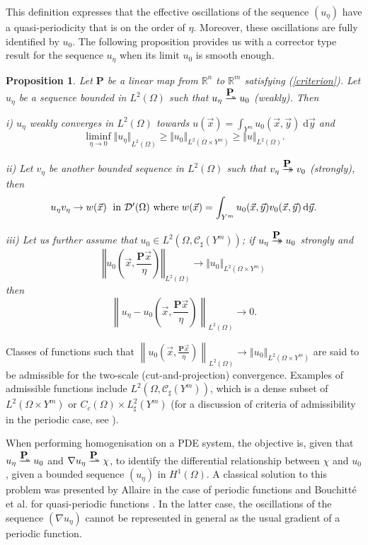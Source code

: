 \documentclass[a4paper,reqno]{amsart}
\numberwithin{equation}{section}
\numberwithin{equation}{section}		%
\numberwithin{figure}{section}			%
\numberwithin{table}{section}				%
\newcommand{\R}{\mathbb{R}}
\newtheorem{proposition}[theorem]{Proposition}
\theoremstyle{definition}
\newcommand{\<}{\ensuremath \leq}
\renewcommand{\>}{\ensuremath \geq}
\def\e{\eta}
\def\ue{u_\e}
\def\limf{\displaystyle{\liminf_{\eta\to 0}}}
\def\xxe{\left(\vec{x},\frac{\textbf{P}\vec{x}}{\e}\right)}
\def\wdto{\buildrel\hbox{$\textbf{P}$}\over
\rightharpoonup \!\!\!\!\! \rightharpoonup}
\def\dto{\buildrel\hbox{$\textbf{P}$}\over
\to \!\!\!\!\! \to}
\def\uo{u_0(\vec{x},\vec{y})}
\def\ve{v_\e}
\def\O{\Omega}
\begin{document}
This definition expresses that the effective oscillations of the
sequence $(u_\e)$ have a quasi-periodicity that is on the order of $\e$. Moreover,
these oscillations are fully identified by $u_0$.
The following proposition \cite[Proposition~2.10]{Bouchitte+etal2010} provides us with
a corrector type result for the sequence
$u_\e$ when its limit $u_0$ is smooth enough.
\begin{proposition}
Let $\textbf{P}$ be a linear map from $\R^n$ to ${\R^m}$ satisfying
(\ref{criterion}). Let $\ue$ be a sequence bounded in $L^2(\O)$ such
that $\ue\wdto u_0$ (weakly).   Then

i) $\ue$ weakly converges in $L^2(\O)$ towards $\displaystyle{u(\vec{x}) = \int_{Y^m} u_0(\vec{x},\vec{y}) \; \mathrm{d}\vec{y}}$ and
\begin{equation}
\limf {\Vert\ue\Vert}_{L^2(\O)}\geq {\Vert u_0 \Vert}_{L^2(\O \times
Y^m)} \geq {\Vert u\Vert}_{L^2(\O)}.
\end{equation}

ii) Let $\ve$ be another bounded sequence in $L^2(\O)$ such that
$v_\e\dto v_0$ (strongly), then
\begin{equation}
\ue\ve\to  w(\vec{x}) \; \hbox{ in ${\mathcal D}'(\O)$ where
$\displaystyle{w(\vec{x}) = \int_{Y^m}\uo v_0(\vec{x},\vec{y})
\,\mathrm{d}\vec{y}}$}.
\end{equation}

iii) Let us further assume that $u_0\in L^2 (\O, \mathcal{C}_\sharp (Y^m))$; if ${\displaystyle\ue\dto  u_0}$ strongly and
$$\displaystyle {{\left\Vert u_0\xxe \right\Vert}_{L^2(\O)} \to{\Vert
u_0\Vert}_{L^2(\O\times Y^m)}}$$
then
\begin{equation}
\displaystyle{{\left\| \ue - u_0\xxe \right\|}_{L^2(\O)}\to  0}.
\end{equation}
\end{proposition}

Classes of functions such that $\displaystyle {{\left\| u_0 \xxe
\right\|}_{L^2(\O)} \to{\left\Vert u_0\right\Vert}_{L^2(\O\times Y^m)}}$ are
said to be admissible for the two-scale (cut-and-projection)
convergence. Examples of admissible functions include $L^2(\O,\mathcal{C}_\sharp(Y^m))$, which is a dense subset of $L^2(\O\times Y^m)$ or $C_c(\Omega)\times L^2_\sharp(Y^m)$ (for a discussion of criteria of admissibility in the periodic case, see \cite{Allaire1992}).



When performing homogenisation on a PDE system, the objective is, given that $u_\e\wdto u_0$ and $\nabla u_\e\wdto \chi$, to identify the differential relationship between
$\chi$ and $u_0$, given a bounded sequence $(u_\e)$ in $H^{1}(\O)$.
A classical solution to this problem was presented by Allaire in the case of periodic functions \cite{Allaire1992} and Bouchitt\'e et al. for quasi-periodic functions
\cite{Bouchitte+etal2010}. In the latter case, the oscillations of the sequence
$(\nabla u_\e)$ cannot be represented in general as the usual gradient  of a periodic function.
\end{document}
